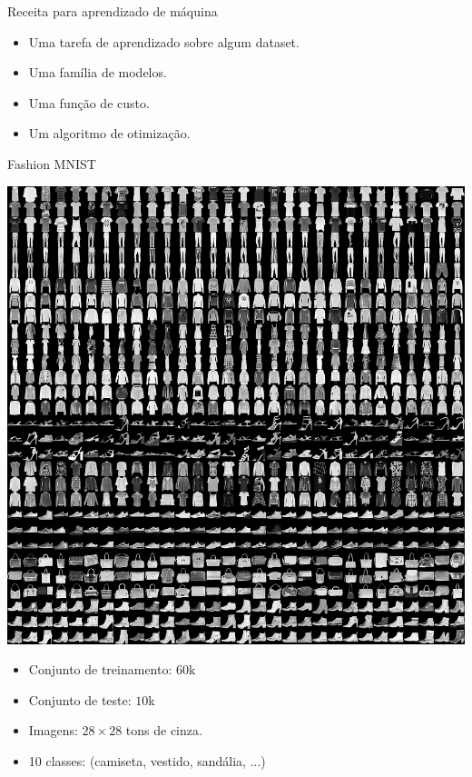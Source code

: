 \documentclass[10pt]{beamer}
\begin{document}
\begin{frame}{Receita para aprendizado de máquina}
\begin{itemize}
\item Uma tarefa de aprendizado sobre algum dataset. 
\vspace{0.3cm}
\item Uma família de modelos. 
\vspace{0.3cm}
\item Uma função de custo. 
\vspace{0.3cm}
\item Um algoritmo de otimização. 
\end{itemize}
\end{frame}


\begin{frame}[fragile]{Fashion MNIST}
\begin{center}
\includegraphics[scale=0.185]{images/fashion-mnist-general.png}
\end{center}
\begin{itemize}
\item Conjunto de treinamento: $60$k
\item Conjunto de teste: $10$k
\item Imagens: $28 \times 28$ tons de cinza.
\item 10 classes: (camiseta, vestido, sandália, ...)
\end{itemize}
\end{frame}
\end{document}
